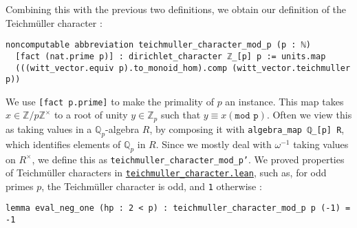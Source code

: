 \documentclass[a4paper,UKenglish,cleveref, autoref, thm-restate]{lipics-v2021}
\newcommand{\lean}[1]{\texttt{#1}\xspace} %
\begin{document}
Combining this with the previous two definitions, we obtain our definition of the Teichmüller character : 
\begin{lstlisting}
noncomputable abbreviation teichmuller_character_mod_p (p : ℕ) 
  [fact (nat.prime p)] : dirichlet_character ℤ_[p] p := units.map 
  (((witt_vector.equiv p).to_monoid_hom).comp (witt_vector.teichmuller p))
\end{lstlisting}
We use \lean{[fact p.prime]} to make the primality of $p$ an instance. This map takes \newline $x \in \mathbb{Z}/p\mathbb{Z}^{\times}$ to a root of unity $y \in \mathbb{Z}_p$ such that $y \equiv x (\texttt{mod p})$. 
Often we view this as taking values in a $\mathbb{Q}_p$-algebra $R$, by composing it 
with \lean{algebra\_map ℚ\_[p] R}, which identifies elements of $\mathbb{Q}_p$ 
in $R$. Since we mostly deal with $\omega ^{-1}$ taking values on $R^{\times}$, we define this as \lean{teichmuller\_character\_mod\_p'}. \newline
We proved properties of Teichmüller characters in \href{https://github.com/laughinggas/p-adic-L-functions/blob/main/src/dirichlet_character/teichmuller_character.lean}{\lean{teichmuller\_character.lean}}, 
such as, for odd primes $p$, the Teichmüller character is odd, and \lean{1} otherwise : 
\begin{lstlisting}
lemma eval_neg_one (hp : 2 < p) : teichmuller_character_mod_p p (-1) = -1
\end{lstlisting}
\end{document}
